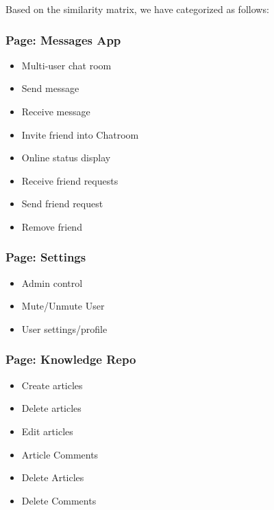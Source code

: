 \documentclass[12pt]{article}
\begin{document}
\newpage

Based on the similarity matrix, we have categorized as follows:
\begin{multicols}{2}

\subsubsection*{Page: Messages App}
\begin{itemize}
    \item Multi-user chat room
    \item Send message
    \item Receive message
    \item Invite friend into Chatroom
    \item Online status display
    \item Receive friend requests
    \item Send friend request
    \item Remove friend
\end{itemize}

\subsubsection*{Page: Settings}
\begin{itemize}
    \item Admin control
    \item Mute/Unmute User
    \item User settings/profile
\end{itemize}

\columnbreak

\subsubsection*{Page: Knowledge Repo}
\begin{itemize}
    \item Create articles
    \item Delete articles
    \item Edit articles
    \item Article Comments
    \item Delete Articles
    \item Delete Comments
\end{itemize}



\end{multicols}
\end{document}
